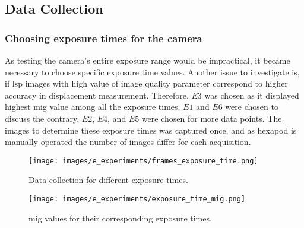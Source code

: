    
\subsection{Data Collection}\label{section:data_collection}
    \subsubsection*{Choosing exposure times for the camera}
        As testing the camera's entire exposure range would be impractical, it became necessary to choose specific exposure time values. Another issue to investigate is, if \gls{lsp} images with high value of image quality parameter correspond to higher accuracy in displacement measurement. Therefore, $E3$ was chosen as it displayed highest \gls{mig} value among all the exposure times. $E1$ and $E6$ were chosen to discuss the contrary. $E2$, $E4$, and $E5$ were chosen for more data points. The images to determine these exposure times was captured once, and as hexapod is manually operated the number of images differ for each acquisition.
        
        \begin{figure}[ht]
            \centering
            \texttt{[image: images/e\_experiments/frames\_exposure\_time.png]}
            \caption{Data collection for different exposure times.}
            \label{fig:frames_exposure_time.png}
        \end{figure}

        \begin{figure}[ht]
            \centering
            \texttt{[image: images/e\_experiments/exposure\_time\_mig.png]}
            \caption{\gls{mig} values for their corresponding exposure times.}
            \label{fig:exposure_time_mig.png}
        \end{figure}
        
